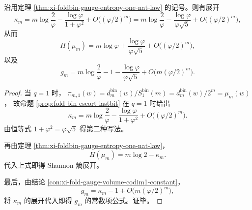 \begin{corollary}\label{cor:xi-foldbin-shannon-gauge-constant-mirror}
沿用定理 \ref{thm:xi-foldbin-gauge-entropy-one-nat-law} 的记号。则有展开
\[
\kappa_m
=
m\log\frac{2}{\varphi}
-\frac{\log\varphi}{1+\varphi^2}
+O\!\bigl((\varphi/2)^m\bigr)
=
m\log\frac{2}{\varphi}
-\frac{\log\varphi}{\varphi\sqrt5}
+O\!\bigl((\varphi/2)^m\bigr),
\]
从而
\[
H(\mu_m)
=
m\log\varphi
+\frac{\log\varphi}{\varphi\sqrt5}
+O\!\bigl((\varphi/2)^m\bigr),
\]
以及
\[
g_m
=
m\log\frac{2}{\varphi}
-1
-\frac{\log\varphi}{\varphi\sqrt5}
+O\!\bigl(m(\varphi/2)^m\bigr).
\]
\end{corollary}
\begin{proof}
当 \(q=1\) 时，
\(
\pi_{m,1}(w)=d_m^{\mathrm{bin}}(w)/S_1^{\mathrm{bin}}(m)=d_m^{\mathrm{bin}}(w)/2^m=\mu_m(w)
\)，
故命题 \ref{prop:fold-bin-escort-lastbit} 在 \(q=1\) 时给出
\[
\kappa_m
=
m\log\frac{2}{\varphi}
-\frac{\log\varphi}{1+\varphi^2}
+O\!\bigl((\varphi/2)^m\bigr).
\]
由恒等式 \(1+\varphi^2=\varphi\sqrt5\) 得第二种写法。

再由定理 \ref{thm:xi-foldbin-gauge-entropy-one-nat-law}，
\[
H(\mu_m)=m\log 2-\kappa_m.
\]
代入上式即得 Shannon 熵展开。

最后，由结论 \ref{con:xi-fold-gauge-volume-codim1-constant}，
\[
g_m=\kappa_m-1+O\!\bigl(m(\varphi/2)^m\bigr),
\]
将 \(\kappa_m\) 的展开代入即得 \(g_m\) 的常数项公式。证毕。
\end{proof}

